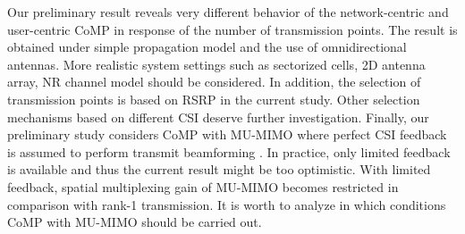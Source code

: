 \documentclass[a4paper,12pt]{article}%
\begin{document}
Our preliminary result reveals very different behavior of the network-centric and user-centric CoMP in response of the number of transmission points. The result is obtained under simple propagation model and the use of omnidirectional antennas. More realistic system settings such as sectorized cells, 2D antenna array, NR channel model should be considered. In addition, the selection of transmission points is based on RSRP in the current study. Other selection mechanisms based on different CSI deserve further investigation. Finally, our preliminary study considers CoMP with MU-MIMO where perfect CSI feedback is assumed to perform transmit beamforming . In practice, only limited feedback is available and thus the current result might be too optimistic. With limited feedback, spatial multiplexing gain of MU-MIMO becomes restricted in comparison with rank-1 transmission. It is worth to analyze in which conditions CoMP with MU-MIMO should be carried out.

 

\end{document}
